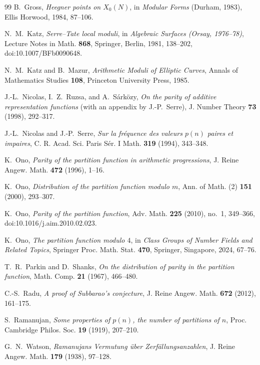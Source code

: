 \documentclass[11pt]{amsart}
\theoremstyle{remark}
\numberwithin{equation}{section}
\begin{document}
\begin{thebibliography}{99}
B.~Gross,
\emph{Heegner points on $X_0(N)$},
in \emph{Modular Forms} (Durham, 1983), Ellis Horwood, 1984, 87--106.

N.~M.~Katz,
\emph{Serre--Tate local moduli},
in \emph{Algebraic Surfaces (Orsay, 1976--78)}, Lecture Notes in Math.
\textbf{868}, Springer, Berlin, 1981, 138--202,
doi:10.1007/BFb0090648.

N.~M.~Katz and B.~Mazur,
\emph{Arithmetic Moduli of Elliptic Curves},
Annals of Mathematics Studies \textbf{108}, Princeton University Press, 1985.

J.-L.~Nicolas, I.~Z.~Ruzsa, and A.~S\'ark\"ozy,
\emph{On the parity of additive representation functions}
(with an appendix by J.-P.~Serre),
J. Number Theory \textbf{73} (1998), 292--317.

J.-L.~Nicolas and J.-P.~Serre,
\emph{Sur la fr\'equence des valeurs $p(n)$ paires et impaires},
C. R. Acad. Sci. Paris S\'er. I Math. \textbf{319} (1994), 343--348.

K.~Ono,
\emph{Parity of the partition function in arithmetic progressions},
J. Reine Angew. Math. \textbf{472} (1996), 1--16.

K.~Ono,
\emph{Distribution of the partition function modulo $m$},
Ann. of Math. (2) \textbf{151} (2000), 293--307.

K.~Ono,
\emph{Parity of the partition function},
Adv. Math. \textbf{225} (2010), no.~1, 349--366,
doi:10.1016/j.aim.2010.02.023.

K.~Ono,
\emph{The partition function modulo $4$},
in \emph{Class Groups of Number Fields and Related Topics},
Springer Proc. Math. Stat. \textbf{470}, Springer, Singapore, 2024, 67--76.

T.~R.~Parkin and D.~Shanks,
\emph{On the distribution of parity in the partition function},
Math. Comp. \textbf{21} (1967), 466--480.

C.-S.~Radu,
\emph{A proof of Subbarao's conjecture},
J. Reine Angew. Math. \textbf{672} (2012), 161--175.

S.~Ramanujan,
\emph{Some properties of $p(n)$, the number of partitions of $n$},
Proc. Cambridge Philos. Soc. \textbf{19} (1919), 207--210.

G.~N.~Watson,
\emph{Ramanujans Vermutung \"uber Zerf\"allungsanzahlen},
J. Reine Angew. Math. \textbf{179} (1938), 97--128.

\end{thebibliography}
\end{document}

